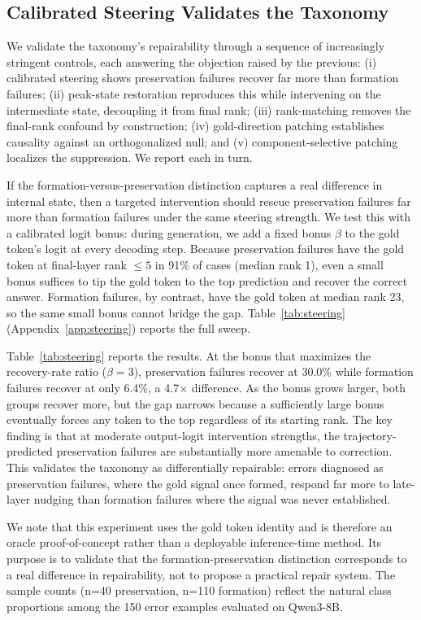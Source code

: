 \documentclass{article} %
\begin{document}
\subsection{Calibrated Steering Validates the Taxonomy}

We validate the taxonomy's repairability through a sequence of increasingly stringent controls, each answering the objection raised by the previous: (i) calibrated steering shows preservation failures recover far more than formation failures; (ii) peak-state restoration reproduces this while intervening on the intermediate state, decoupling it from final rank; (iii) rank-matching removes the final-rank confound by construction; (iv) gold-direction patching establishes causality against an orthogonalized null; and (v) component-selective patching localizes the suppression. We report each in turn.

If the formation-versus-preservation distinction captures a real difference in internal state, then a targeted intervention should rescue preservation failures far more than formation failures under the same steering strength. We test this with a calibrated logit bonus: during generation, we add a fixed bonus $\beta$ to the gold token's logit at every decoding step. Because preservation failures have the gold token at final-layer rank $\le5$ in 91\% of cases (median rank 1), even a small bonus suffices to tip the gold token to the top prediction and recover the correct answer. Formation failures, by contrast, have the gold token at median rank 23, so the same small bonus cannot bridge the gap. Table~\ref{tab:steering} (Appendix~\ref{app:steering}) reports the full sweep.

Table~\ref{tab:steering} reports the results. At the bonus that maximizes the recovery-rate ratio ($\beta = 3$), preservation failures recover at 30.0\% while formation failures recover at only 6.4\%, a 4.7$\times$ difference. As the bonus grows larger, both groups recover more, but the gap narrows because a sufficiently large bonus eventually forces any token to the top regardless of its starting rank. The key finding is that at moderate output-logit intervention strengths, the trajectory-predicted preservation failures are substantially more amenable to correction. This validates the taxonomy as differentially repairable: errors diagnosed as preservation failures, where the gold signal once formed, respond far more to late-layer nudging than formation failures where the signal was never established.

We note that this experiment uses the gold token identity and is therefore an oracle proof-of-concept rather than a deployable inference-time method. Its purpose is to validate that the formation-preservation distinction corresponds to a real difference in repairability, not to propose a practical repair system. The sample counts (n=40 preservation, n=110 formation) reflect the natural class proportions among the 150 error examples evaluated on Qwen3-8B.
\end{document}
